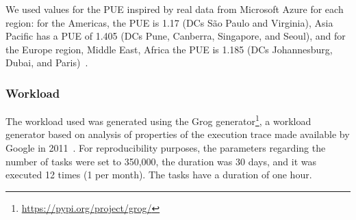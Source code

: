 We used values for the PUE inspired by real data from Microsoft Azure for each region: for the Americas, the PUE is 1.17 (DCs São Paulo and Virginia), Asia Pacific has a PUE of 1.405 (DCs Pune, Canberra, Singapore, and Seoul), and for the Europe region, Middle East, Africa the PUE is 1.185 (DCs Johannesburg, Dubai, and Paris)~\cite{walsh2022_azurepue}. 




  

    

    



\subsubsection{Workload}

The workload used was generated using the Grog generator\footnote{\url{https://pypi.org/project/grog/}},  a workload generator based on analysis of properties of the execution trace made available by Google in 2011~\cite{DACOSTA2018_grog}. For reproducibility purposes, the parameters regarding the number of tasks were set to 350,000, the duration was 30 days, and it was executed 12 times (1 per month). The tasks have a duration of one hour.


